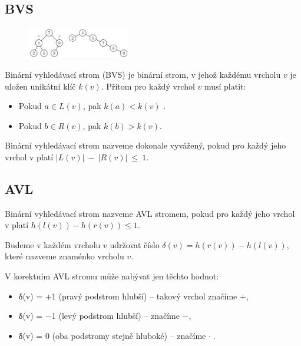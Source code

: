 \documentclass{szzclass}
\begin{document}
\subsection{BVS}

\begin{figure}[h]
\centering
\includegraphics[width=0.4\textwidth]{topics/bi-spol-5/images/bvs.PNG}
\end{figure}

Binární vyhledávací strom (BVS) je binární strom, v jehož
každému vrcholu $v$ je uložen unikátní klíč $k(v)$. Přitom pro každý
vrchol $v$ musí platit:
\begin{itemize}
    \item Pokud $a \in L(v)$, pak $k(a) < k(v)$ .
    \item Pokud $b \in R(v)$, pak $k(b) > k(v)$.
\end{itemize}

Binární vyhledávací strom nazveme dokonale vyvážený, pokud pro každý jeho vrchol v platí $|L(v)|~-~|R(v)|~\leq~1$.

\subsection{AVL}

Binární vyhledávací strom nazveme AVL stromem, pokud pro každý
jeho vrchol v platí $h(l(v)) − h(r(v)) \leq 1$.

Budeme v každém vrcholu $v$ udržovat číslo $δ(v) = h(r(v)) - h(l(v))$, které nazveme znaménko vrcholu $v$.

V korektním AVL stromu může nabývat jen těchto hodnot:
\begin{itemize}
    \item δ(v) = +1 (pravý podstrom hlubší) – takový vrchol značíme \textcircled{$+$},
    \item δ(v) = −1 (levý podstrom hlubší) – značíme \textcircled{$-$},
    \item δ(v) = 0 (oba podstromy stejně hluboké) – značíme \textcircled{$\cdot$}.
\end{itemize}

\end{document}
